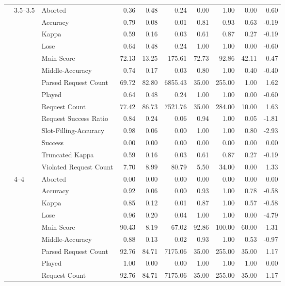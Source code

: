 \begin{tabular}{lllrrrrrrr}
\cline{2-10}
 & \multirow[t]{14}{*}{3.5--3.5} & Aborted & 0.36 & 0.48 & 0.24 & 0.00 & 1.00 & 0.00 & 0.60 \\
 &  & Accuracy & 0.79 & 0.08 & 0.01 & 0.81 & 0.93 & 0.63 & -0.19 \\
 &  & Kappa & 0.59 & 0.16 & 0.03 & 0.61 & 0.87 & 0.27 & -0.19 \\
 &  & Lose & 0.64 & 0.48 & 0.24 & 1.00 & 1.00 & 0.00 & -0.60 \\
 &  & Main Score & 72.13 & 13.25 & 175.61 & 72.73 & 92.86 & 42.11 & -0.47 \\
 &  & Middle-Accuracy & 0.74 & 0.17 & 0.03 & 0.80 & 1.00 & 0.40 & -0.40 \\
 &  & Parsed Request Count & 69.72 & 82.80 & 6855.43 & 35.00 & 255.00 & 1.00 & 1.62 \\
 &  & Played & 0.64 & 0.48 & 0.24 & 1.00 & 1.00 & 0.00 & -0.60 \\
 &  & Request Count & 77.42 & 86.73 & 7521.76 & 35.00 & 284.00 & 10.00 & 1.63 \\
 &  & Request Success Ratio & 0.84 & 0.24 & 0.06 & 0.94 & 1.00 & 0.05 & -1.81 \\
 &  & Slot-Filling-Accuracy & 0.98 & 0.06 & 0.00 & 1.00 & 1.00 & 0.80 & -2.93 \\
 &  & Success & 0.00 & 0.00 & 0.00 & 0.00 & 0.00 & 0.00 & 0.00 \\
 &  & Truncated Kappa & 0.59 & 0.16 & 0.03 & 0.61 & 0.87 & 0.27 & -0.19 \\
 &  & Violated Request Count & 7.70 & 8.99 & 80.79 & 5.50 & 34.00 & 0.00 & 1.33 \\
\cline{2-10}
 & \multirow[t]{14}{*}{4--4} & Aborted & 0.00 & 0.00 & 0.00 & 0.00 & 0.00 & 0.00 & 0.00 \\
 &  & Accuracy & 0.92 & 0.06 & 0.00 & 0.93 & 1.00 & 0.78 & -0.58 \\
 &  & Kappa & 0.85 & 0.12 & 0.01 & 0.87 & 1.00 & 0.57 & -0.58 \\
 &  & Lose & 0.96 & 0.20 & 0.04 & 1.00 & 1.00 & 0.00 & -4.79 \\
 &  & Main Score & 90.43 & 8.19 & 67.02 & 92.86 & 100.00 & 60.00 & -1.31 \\
 &  & Middle-Accuracy & 0.88 & 0.13 & 0.02 & 0.93 & 1.00 & 0.53 & -0.97 \\
 &  & Parsed Request Count & 92.76 & 84.71 & 7175.06 & 35.00 & 255.00 & 35.00 & 1.17 \\
 &  & Played & 1.00 & 0.00 & 0.00 & 1.00 & 1.00 & 1.00 & 0.00 \\
 &  & Request Count & 92.76 & 84.71 & 7175.06 & 35.00 & 255.00 & 35.00 & 1.17 \\

\end{tabular}
